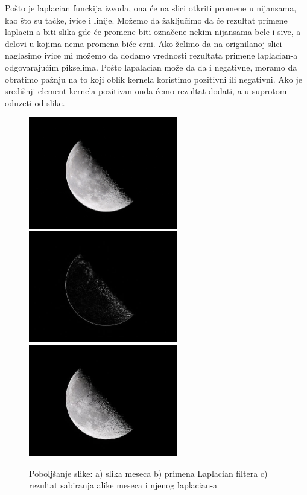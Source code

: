 \documentclass[a4paper,12pt,titlepage]{article}
\begin{document}
Pošto je laplacian funckija izvoda, ona će na slici otkriti promene u nijansama, kao što su tačke, ivice i linije. Možemo da žaključimo da će rezultat primene laplacin-a biti slika gde će promene biti označene nekim nijansama bele i sive, a delovi u kojima nema promena biće crni. Ako želimo da na orignilanoj slici naglasimo ivice mi možemo da dodamo vrednosti rezultata primene laplacian-a odgovarajućim pikselima. Pošto lapalacian može da da i negativne, moramo da obratimo pažnju na to koji oblik kernela koristimo pozitivni ili negativni. Ako je središnji element kernela pozitivan onda ćemo rezultat dodati, a u suprotom oduzeti od slike.

\begin{figure}[ht!]
\centering
\includegraphics[width=65mm]{img/moon.jpg}
\includegraphics[width=65mm]{img/moonLap.jpg}
\includegraphics[width=65mm]{img/moonEn.jpg}
\caption{Poboljšanje slike: a) slika meseca b) primena Laplacian filtera c) rezultat sabiranja alike meseca i njenog laplacian-a}
\label{overflow}
\end{figure}
\end{document}
